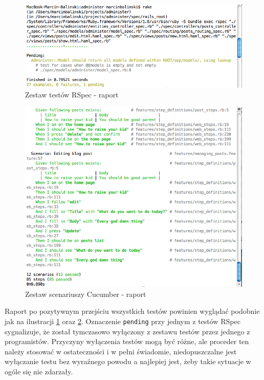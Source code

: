     
    \vspace{5 mm}
    \begin{figure}[!h]
  		\begin{center}
  			\includegraphics[width=\linewidth]{images/spec_report.png}
  			\caption{Zestaw testów RSpec - raport}
  			\label{spec_report}
  		\end{center}
  	\end{figure}
  	
  	\clearpage
  	
  	\begin{figure}[!h]
  		\begin{center}
  			\includegraphics[width=\linewidth]{images/features_report.png}
  			\caption{Zestaw scenariuszy Cucumber - raport}
  			\label{features_report}
  		\end{center}
  	\end{figure}
  	
  	  Raport po pozytywnym przejściu wszystkich testów powinien wyglądać podobnie jak na ilustracji \ref{spec_report} oraz \ref{features_report}. Oznaczenie \texttt{pending} przy jednym z testów RSpec sygnalizuje, że został tymczasowo wyłączony z zestawu testów przez jednego z programistów. Przyczyny wyłączenia testów mogą być różne, ale proceder ten należy stosować w ostateczności i w pełni świadomie, niedopuszczalne jest wyłączanie testu bez wyraźnego powodu a najlepiej jest, żeby takie sytuacje w ogóle się nie zdarzały.
  	  
